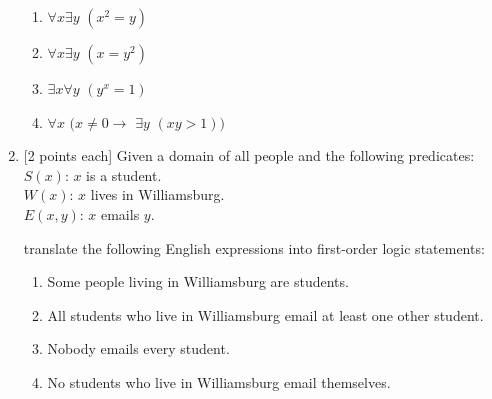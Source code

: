 \documentclass[11pt]{article}
\begin{document}
\begin{enumerate}
\begin{enumerate}[label=\alph*.]
\itemsep-0mm
\item $\forall x \exists y$ $(x^2 = y)$
\item $\forall x \exists y$ $(x = y^2)$
\item $\exists x \forall y$ $(y^x = 1)$
\item $\forall x$ $(x \neq 0 \rightarrow$ $\exists y$ $(xy > 1))$
\end{enumerate}

\vskip 0.5cm


\item {[2 points each]}  Given a domain of all people and the following predicates:
\\ \hspace*{3cm} {$S(x)$}: $x$ is a student.
\\ \hspace*{3cm} {$W(x)$}: $x$ lives in Williamsburg.
\\ \hspace*{3cm} {$E(x,y)$}: $x$ emails $y$.

translate the following English expressions into first-order logic statements:

\begin{enumerate}[label=\alph*.]
\itemsep-0mm
\item Some people living in Williamsburg are students.
\item All students who live in Williamsburg email at least one other student.
\item Nobody emails every student.
\item No students who live in Williamsburg email themselves.
\end{enumerate}


\end{enumerate}
\end{document}
